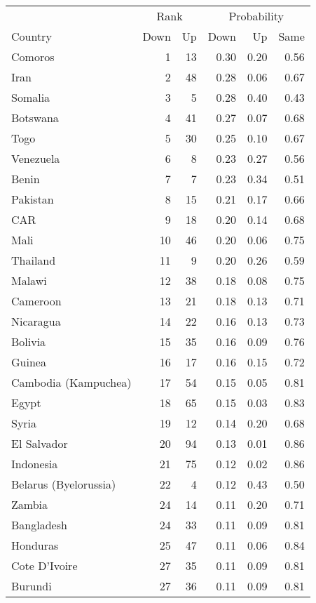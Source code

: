 
\begin{longtable}[t]{lrrrrr}
\toprule
\multicolumn{1}{c}{ } & \multicolumn{2}{c}{Rank} & \multicolumn{3}{c}{Probability} \\
\cmidrule(l{3pt}r{3pt}){2-3} \cmidrule(l{3pt}r{3pt}){4-6}
Country & Down & Up & Down & Up & Same\\
\midrule
Comoros & 1 & 13 & 0.30 & 0.20 & 0.56\\
Iran & 2 & 48 & 0.28 & 0.06 & 0.67\\
Somalia & 3 & 5 & 0.28 & 0.40 & 0.43\\
Botswana & 4 & 41 & 0.27 & 0.07 & 0.68\\
Togo & 5 & 30 & 0.25 & 0.10 & 0.67\\
\addlinespace
Venezuela & 6 & 8 & 0.23 & 0.27 & 0.56\\
Benin & 7 & 7 & 0.23 & 0.34 & 0.51\\
Pakistan & 8 & 15 & 0.21 & 0.17 & 0.66\\
CAR & 9 & 18 & 0.20 & 0.14 & 0.68\\
Mali & 10 & 46 & 0.20 & 0.06 & 0.75\\
\addlinespace
Thailand & 11 & 9 & 0.20 & 0.26 & 0.59\\
Malawi & 12 & 38 & 0.18 & 0.08 & 0.75\\
Cameroon & 13 & 21 & 0.18 & 0.13 & 0.71\\
Nicaragua & 14 & 22 & 0.16 & 0.13 & 0.73\\
Bolivia & 15 & 35 & 0.16 & 0.09 & 0.76\\
\addlinespace
Guinea & 16 & 17 & 0.16 & 0.15 & 0.72\\
Cambodia (Kampuchea) & 17 & 54 & 0.15 & 0.05 & 0.81\\
Egypt & 18 & 65 & 0.15 & 0.03 & 0.83\\
Syria & 19 & 12 & 0.14 & 0.20 & 0.68\\
El Salvador & 20 & 94 & 0.13 & 0.01 & 0.86\\
\addlinespace
Indonesia & 21 & 75 & 0.12 & 0.02 & 0.86\\
Belarus (Byelorussia) & 22 & 4 & 0.12 & 0.43 & 0.50\\
Zambia & 24 & 14 & 0.11 & 0.20 & 0.71\\
Bangladesh & 24 & 33 & 0.11 & 0.09 & 0.81\\
Honduras & 25 & 47 & 0.11 & 0.06 & 0.84\\
\addlinespace
Cote D'Ivoire & 27 & 35 & 0.11 & 0.09 & 0.81\\
Burundi & 27 & 36 & 0.11 & 0.09 & 0.81\\

\end{longtable}
